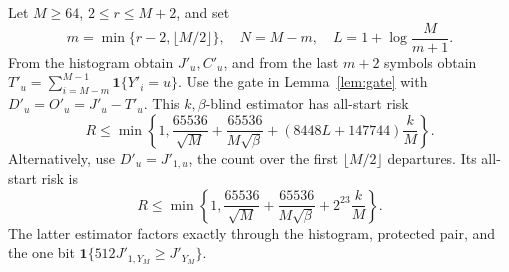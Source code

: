 \begin{proposition}
\label{prop:finite-upper}
Let $M\ge64$, $2\le r\le M+2$, and set
\[
 m=\min\{r-2,\lfloor M/2\rfloor\},\quad
 N=M-m,\quad L=1+\log\frac M{m+1}.
\]
From the histogram obtain $J'_u,C'_u$, and from the last $m+2$ symbols
obtain $T'_u=\sum_{i=M-m}^{M-1}\mathbf1\{Y'_i=u\}$.
Use the gate in Lemma~\ref{lem:gate} with $D'_u=O'_u=J'_u-T'_u$.
This $k,\beta$-blind estimator has all-start risk
\begin{equation}\label{eq:p-suffix-upper}
 R\le\min\left\{1,\frac{65536}{\sqrt M}
       +\frac{65536}{M\sqrt\beta}
       +(8448L+147744)\frac kM\right\}.
\end{equation}
Alternatively, use $D'_u=J'_{1,u}$, the count over the first
$\lfloor M/2\rfloor$ departures.  Its all-start risk is
\begin{equation}\label{eq:p-half-upper}
 R\le\min\left\{1,\frac{65536}{\sqrt M}
       +\frac{65536}{M\sqrt\beta}+2^{23}\frac kM\right\}.
\end{equation}
The latter estimator factors exactly through the histogram, protected
pair, and the one bit $\mathbf1\{512J'_{1,Y_M}\ge J'_{Y_M}\}$.
\end{proposition}

